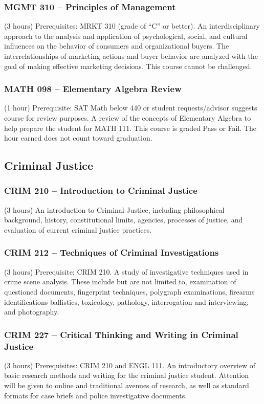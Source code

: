 \subsubsection{MGMT 310 -- Principles of Management}
(3 hours) Prerequisites: MRKT 310 (grade of “C” or better). An interdisciplinary approach to the analysis and application of psychological, social, and cultural influences on the behavior of consumers and organizational buyers. The interrelationships of marketing actions and buyer behavior are analyzed with the goal of making effective marketing decisions. This course cannot be challenged.

\subsubsection{MATH 098 -- Elementary Algebra Review}
(1 hour) Prerequisite: SAT Math below 440 or student requests/advisor suggests course for review purposes. A review of the concepts of Elementary Algebra to help prepare the student for MATH 111. This course is graded Pass or Fail. The hour earned does not count toward graduation.

\subsection{Criminal Justice}

\subsubsection{CRIM 210 -- Introduction to Criminal Justice}
(3 hours) An introduction to Criminal Justice, including philosophical background, history, constitutional limits, agencies, processes of justice, and evaluation of current criminal justice practices.

\subsubsection{CRIM 212 -- Techniques of Criminal Investigations}
(3 hours) Prerequisite: CRIM 210. A study of investigative techniques used in crime scene analysis. These include but are not limited to, examination of questioned documents, fingerprint techniques, polygraph examinations, firearms identifications ballistics, toxicology, pathology, interrogation and interviewing, and photography.

\subsubsection{CRIM 227 -- Critical Thinking and Writing in Criminal Justice}
(3 hours) Prerequisites: CRIM 210 and ENGL 111. An introductory overview of basic research methods and writing for the criminal justice student. Attention will be given to online and traditional avenues of research, as well as standard formats for case briefs and police investigative documents.

